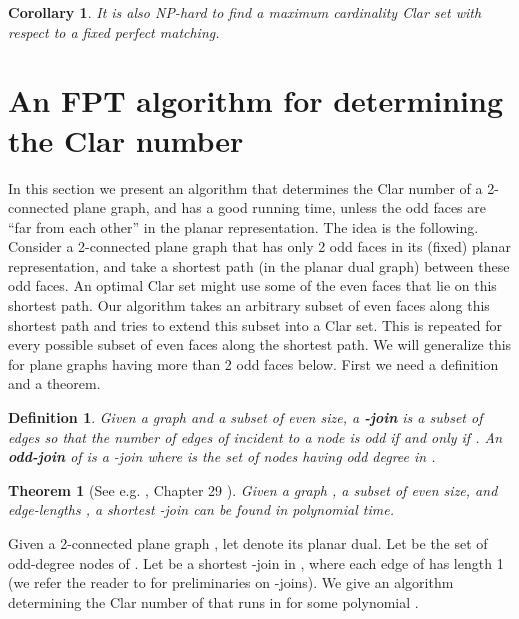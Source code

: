 \documentclass{article}
\newtheorem{theorem}{Theorem}
\newtheorem{defn}{Definition}
\newtheorem{cor}{Corollary}
\begin{document}
\begin{cor}
It is also NP-hard to find a maximum cardinality Clar set with respect to a fixed perfect matching. 
\end{cor}


\section{An FPT algorithm for determining the Clar number}
\label{sec:alg}

In this section we present an algorithm that determines the Clar
number of a 2-connected plane graph, and has a good running time,
unless the odd faces are ``far from each other'' in the planar
representation.  The idea is the following. Consider a 2-connected
plane graph that has only 2 odd faces in its (fixed) planar
representation, and take a shortest path (in the planar dual graph)
between these odd faces. An optimal Clar set might use some of the
even faces that lie on this shortest path. Our algorithm takes an
arbitrary subset of even faces along this shortest path and tries to
extend this subset into a Clar set. This is repeated for every
possible subset of even faces along the shortest path. We will
generalize this for plane graphs having more than 2 odd faces
below. First we need a definition and a theorem.






\begin{defn}
Given a graph  and a subset  of even size, a
\textbf{-join} is a subset of edges  so that the number of
edges of  incident to a node  is odd if and only if . An \textbf{odd-join} of  is a -join where  is the set of nodes having odd degree in .
\end{defn}

\begin{theorem}[See e.g. \cite{lexbook}, Chapter 29 ]
Given a graph , a subset  of even size, and edge-lengths , a shortest -join can be found in polynomial time.
\end{theorem}





Given a 2-connected plane graph , let  denote
its planar dual. Let  be the set of odd-degree nodes
of . Let  be a shortest -join in ,
where each edge of  has length 1 (we refer the reader to \cite[Chapter 29]{lexbook} for preliminaries on -joins). We give an algorithm
determining the Clar number of  that runs in  for some polynomial .
\end{document}

